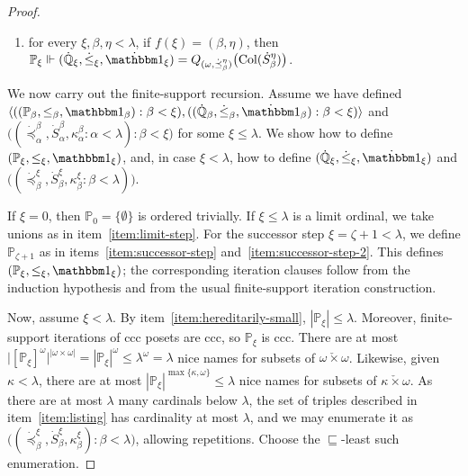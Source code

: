 \begin{proof}
\begin{enumerate}[label=(\arabic*)]
  set of all triples
  $(\dot{\preceq},\dot S,\kappa)$ such that $\kappa<\lambda$ is a cardinal,
  $\dot{\preceq}$ is a $\mathbb P_\xi$-nice name for a subset of
  $\check{\omega\times\omega}$, $\dot S$ is a $\mathbb P_\xi$-nice name for
  a subset of $\check{\kappa\times\omega}$, and
  \[
  \begin{aligned}
  \mathbb P_\xi\Vdash{}&(\omega, \dot{\preceq}) \text{ is an } \omega\text{-tree and}\\
  &\Col(\dot S)\text{ is an infinite almost disjoint family of subtrees of }(\omega,\dot{\preceq})
  \end{aligned}
  \]
  \item \label{item:forcing-definitions} for every $\xi,\beta,\eta<\lambda$,
  if $f(\xi)=(\beta,\eta)$, then $\mathbb P_\xi\Vdash
    (\dot{\mathbb Q}_\xi,\dot{\leq}_\xi,\dot{\mathbbm 1}_\xi)
    =
    Q_{(\omega,\dot{\preceq}^\eta_\beta)}
    \bigl(\Col(\dot S^\eta_\beta)\bigr)$.
\end{enumerate}

We now carry out the finite-support recursion.
Assume we have defined $\langle((\mathbb P_\beta, \leq_\beta, \mathbbm 1_\beta):\beta<\xi), ((\dot{\mathbb Q}_\beta, \dot{\leq}_\beta, \dot{\mathbbm 1}_\beta):\beta<\xi)\rangle$ and $\bigl((\dot{\preceq}^\beta_\alpha,\dot S^\beta_\alpha,\kappa^\beta_\alpha:\alpha<\lambda):\beta<\xi\bigr)$ for some $\xi\leq\lambda$.
We show how to define $(\mathbb P_\xi, \leq_\xi, \mathbbm 1_\xi)$, and, in case $\xi<\lambda$, how to define $(\dot{\mathbb Q}_\xi, \dot{\leq}_\xi, \dot{\mathbbm 1}_\xi)$ and $\bigl((\dot{\preceq}^\xi_\beta,\dot S^\xi_\beta,\kappa^\xi_\beta:\beta<\lambda)\bigr)$.

If $\xi=0$, then $\mathbb P_0=\{\emptyset\}$ is ordered trivially.
If $\xi\leq\lambda$ is a limit ordinal, we take unions as in item~\ref{item:limit-step}.
For the successor step $\xi=\zeta+1<\lambda$, we define
$\mathbb P_{\zeta+1}$ as in items~\ref{item:successor-step}
and~\ref{item:successor-step-2}.
This defines $(\mathbb P_\xi,\leq_\xi,\mathbbm 1_\xi)$; the corresponding iteration clauses follow from the induction hypothesis and from the usual finite-support iteration construction.

Now, assume $\xi<\lambda$. 
By item~\ref{item:hereditarily-small}, $|\mathbb P_\xi|\leq\lambda$.
Moreover, finite-support iterations of ccc posets are ccc, so
$\mathbb P_\xi$ is ccc.
There are at most $\bigl|[\mathbb P_\xi]^\omega\bigr|^{|\omega\times\omega|}
=|\mathbb P_\xi|^\omega\leq\lambda^\omega=\lambda$ nice names for subsets of $\check{\omega\times\omega}$.
Likewise, given $\kappa<\lambda$, there are at most
$|\mathbb P_\xi|^{\max\{\kappa,\omega\}}\leq \lambda$ nice names for subsets of $\check{\kappa\times \omega}$.
As there are at most $\lambda$ many cardinals below $\lambda$, the set of triples described in item~\ref{item:listing} has cardinality at most $\lambda$, and we may enumerate it as
$\bigl((\dot{\preceq}^\xi_\beta,\dot S^\xi_\beta,\kappa^\xi_\beta):\beta<\lambda\bigr)$, allowing repetitions.
Choose the $\sqsubseteq$-least such enumeration.


\end{proof}
